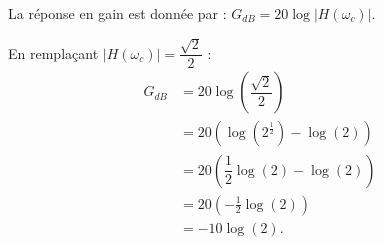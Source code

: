 \medskip

La réponse en gain est donnée par :
$G_{dB} = 20 \log |H(\omega_c)|.$

En remplaçant $|H(\omega_c)| = \dfrac{\sqrt{2}}{2}$ :
\begin{align*}
G_{dB} &= 20 \log\left(\dfrac{\sqrt{2}}{2}\right) \\
&= 20 \left(\log\left(2^{\frac{1}{2}}\right) - \log(2)\right) \\
&= 20 \left(\dfrac{1}{2}\log(2) - \log(2)\right) \\
&= 20 \left(-\frac{1}{2} \log(2)\right) \\
&= -10 \log(2).
\end{align*}

\bigskip
